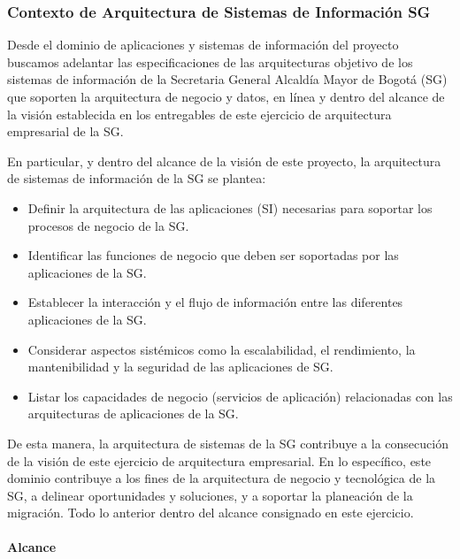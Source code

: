\documentclass[
	a4paper, %
	12pt, %
]{include/CSSullivanBusinessReport}
\def\tightlist{}
\begin{document}
\subsubsection{Contexto de Arquitectura de Sistemas de Información
SG}\label{sec:contexto-de-arquitectura-de-sistemas-de-informaciuxf3n-sg}

Desde el dominio de aplicaciones y sistemas de información del proyecto
buscamos adelantar las especificaciones de las arquitecturas objetivo de
los sistemas de información de la Secretaria General Alcaldía Mayor de
Bogotá (SG) que soporten la arquitectura de negocio y datos, en línea y
dentro del alcance de la visión establecida en los entregables de este
ejercicio de arquitectura empresarial de la SG.

En particular, y dentro del alcance de la visión de este proyecto, la
arquitectura de sistemas de información de la SG se plantea:

\begin{itemize}
\tightlist
\item
  Definir la arquitectura de las aplicaciones (SI) necesarias para
  soportar los procesos de negocio de la SG.
\item
  Identificar las funciones de negocio que deben ser soportadas por las
  aplicaciones de la SG.
\item
  Establecer la interacción y el flujo de información entre las
  diferentes aplicaciones de la SG.
\item
  Considerar aspectos sistémicos como la escalabilidad, el rendimiento,
  la mantenibilidad y la seguridad de las aplicaciones de SG.
\item
  Listar los capacidades de negocio (servicios de aplicación)
  relacionadas con las arquitecturas de aplicaciones de la SG.
\end{itemize}

De esta manera, la arquitectura de sistemas de la SG contribuye a la
consecución de la visión de este ejercicio de arquitectura empresarial.
En lo específico, este dominio contribuye a los fines de la arquitectura
de negocio y tecnológica de la SG, a delinear oportunidades y
soluciones, y a soportar la planeación de la migración. Todo lo anterior
dentro del alcance consignado en este ejercicio.

\paragraph{Alcance}\label{sec:alcance}
\end{document}
